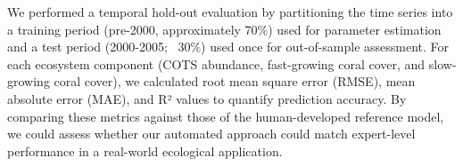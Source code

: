 We performed a temporal hold-out evaluation by partitioning the time series into a training period (pre-2000, approximately 70\%) used for parameter estimation and a test period (2000-2005; ~30\%) used once for out-of-sample assessment. For each ecosystem component (COTS abundance, fast-growing coral cover, and slow-growing coral cover), we calculated root mean square error (RMSE), mean absolute error (MAE), and R² values to quantify prediction accuracy. By comparing these metrics against those of the human-developed reference model, we could assess whether our automated approach could match expert-level performance in a real-world ecological application.


